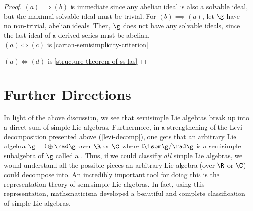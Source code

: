 \documentclass[11pt,leqno,oneside]{amsart}
\numberwithin{thm}{section}
\begin{document}
\begin{proof}
  \((a) \implies (b)\) is immediate since any abelian ideal is also a
  solvable ideal, but the maximal solvable ideal must be trivial. For
  \((b) \implies (a)\), let \(\g\) have no non-trivial, abelian
  ideals. Then, \(\g\) does not have any solvable ideals, since the
  last ideal of a derived series must be abelian. \\

  \((a) \iff (c)\) is \ref{cartan-semisimplicity-criterion}

  \((a) \iff (d)\) is \ref{structure-theorem-of-ss-las}
\end{proof}
\section{Further Directions}
In light of the above discussion, we see that semisimple Lie algebras
break up into a direct sum of simple Lie algebras. Furthermore, in a
strengthening of the Levi decomposition presented above
(\ref{levi-decomp}), one gets that an arbitrary Lie algebra \(\g =
\mathfrak{l} \oplus \rad \g\) over \(\R\) or \(\C\) where
\(\mathfrak{l} \isom \g/\rad \g\) 
is a semisimple subalgebra of \(\g\) called a . Thus, if we could classifly \emph{all} simple Lie
algebras, we would understand all the possible pieces an arbitrary Lie
algebra (over \(\R\) or \(\C\)) could decompose into. An incredibly
important tool for doing this is the representation theory of
semisimple Lie algebras. In fact, using this representation,
mathematicisna developed a beautiful and complete
classification of simple Lie algebras.
\begin{bibdiv}
  \begin{biblist}
  \end{biblist}
\end{bibdiv}
\end{document}
